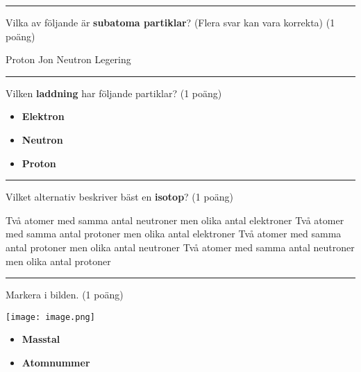 \documentclass{exam}
\begin{document}
\hrule 
\vspace{5mm} 
\begin{questions}

\question Vilka av följande är \textbf{subatoma partiklar}? (Flera svar kan vara korrekta) (1 poäng)
\vspace{2mm} 
\begin{checkboxes}
    \choice Proton
    \choice Jon
    \choice Neutron
    \choice Legering
\end{checkboxes}

\vspace{5mm} 
\hrule 
\vspace{5mm} 

\question Vilken \textbf{laddning} har följande partiklar? (1 poäng)
\begin{itemize}
     \vspace{5mm} 
     \item \textbf{Elektron}
     \vspace{5mm} 
     \item \textbf{Neutron}
    \vspace{5mm} 
     \item \textbf{Proton}
     \vspace{5mm} 
\end{itemize}

\vspace{5mm} 
\hrule 
\vspace{5mm} 

\question Vilket alternativ beskriver bäst en \textbf{isotop}? (1 poäng)
\vspace{2mm} 
\begin{checkboxes}
    \choice Två atomer med samma antal neutroner men olika antal elektroner
    \choice Två atomer med samma antal protoner men olika antal elektroner
    \choice Två atomer med samma antal protoner men olika antal neutroner
    \choice Två atomer med samma antal neutroner men olika antal protoner
\end{checkboxes}

\vspace{5mm} 
\hrule 
\vspace{5mm} 

\question Markera i bilden. (1 poäng)

\begin{center}
    \begin{minipage}{0.4\textwidth}
        \texttt{[image: image.png]}
    \end{minipage}
    \begin{minipage}{0.5\textwidth}
        \begin{itemize}
            \item \textbf{Masstal}
            \item \textbf{Atomnummer}
        \end{itemize}
    \end{minipage}
\end{center}




\end{questions}
\end{document}
